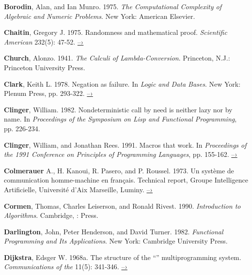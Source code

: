  \label{Borodin and Munro (1975)}
\textbf{Borodin}, Alan, and Ian Munro.  1975.  \textit{The Computational Complexity of
Algebraic and Numeric Problems}. New York: American Elsevier.

 \label{Chaitin 1975}
\textbf{Chaitin}, Gregory J.  1975.  Randomness and mathematical proof.
\textit{Scientific American} 232(5): 47-52.
\href{https://www.cs.auckland.ac.nz/~chaitin/sciamer.html}{–›}

 \label{Church (1941)}
\textbf{Church}, Alonzo.  1941.  \textit{The Calculi of Lambda-Conversion}.  Princeton,
N.J.: Princeton University Press.

 \label{Clark (1978)}
\textbf{Clark}, Keith L.  1978.  Negation as failure.  In \textit{Logic and Data Bases}.
New York: Plenum Press, pp. 293-322.
\href{http://www.doc.ic.ac.uk/~klc/neg.html}{–›}

 \label{Clinger (1982)}
\textbf{Clinger}, William.  1982.  Nondeterministic call by need is neither lazy nor by
name. In \textit{Proceedings of the  Symposium on Lisp and
Functional Programming}, pp. 226-234.

 \label{Clinger and Rees 1991}
\textbf{Clinger}, William, and Jonathan Rees.  1991.  Macros that work.  In
\textit{Proceedings of the 1991  Conference on Principles of
Programming Languages}, pp. 155-162.
\href{http://mumble.net/~jar/pubs/macros_that_work.ps}{–›}

 \label{Colmerauer et al. 1973}
\textbf{Colmerauer} A., H. Kanoui, R. Pasero, and P. Roussel.  1973.  Un syst\`eme de
communication homme-machine en fran\c{c}ais.  Technical report, Groupe
Intelligence Artificielle, Universit\'e d'Aix Marseille, Luminy.
\href{http://alain.colmerauer.free.fr/alcol/ArchivesPublications/HommeMachineFr/HoMa.pdf}{–›}

 \label{Cormen et al. 1990}
\textbf{Cormen}, Thomas, Charles Leiserson, and Ronald Rivest.  1990. \textit{Introduction
to Algorithms}. Cambridge, :  Press.

 \label{Darlington et al. 1982}
\textbf{Darlington}, John, Peter Henderson, and David Turner.  1982.  \textit{Functional
Programming and Its Applications}. New York: Cambridge University Press.

 \label{Dijkstra 1968a}
\textbf{Dijkstra}, Edsger W. 1968a.  The structure of the ``''
multiprogramming system.  \textit{Communications of the }
11(5): 341-346.
\href{http://www.cs.utexas.edu/users/EWD/ewd01xx/EWD196.PDF}{–›}

